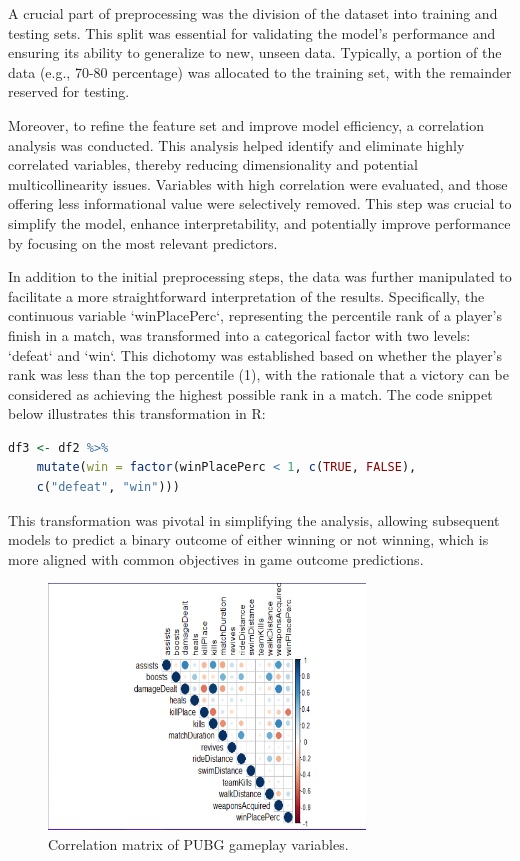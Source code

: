 \documentclass[12pt]{article}
\begin{document}
A crucial part of preprocessing was the division of the dataset into training and testing sets. This split was essential for validating the model's performance and ensuring its ability to generalize to new, unseen data. Typically, a portion of the data (e.g., 70-80 percentage) was allocated to the training set, with the remainder reserved for testing.

Moreover, to refine the feature set and improve model efficiency, a correlation analysis was conducted. This analysis helped identify and eliminate highly correlated variables, thereby reducing dimensionality and potential multicollinearity issues. Variables with high correlation were evaluated, and those offering less informational value were selectively removed. This step was crucial to simplify the model, enhance interpretability, and potentially improve performance by focusing on the most relevant predictors.

In addition to the initial preprocessing steps, the data was further manipulated to facilitate a more straightforward interpretation of the results. Specifically, the continuous variable `winPlacePerc`, representing the percentile rank of a player's finish in a match, was transformed into a categorical factor with two levels: `defeat` and `win`. This dichotomy was established based on whether the player's rank was less than the top percentile (1), with the rationale that a victory can be considered as achieving the highest possible rank in a match. The code snippet below illustrates this transformation in R:

\begin{lstlisting}[language=R, caption=Creating a binary outcome variable]
	df3 <- df2 %>%
	mutate(win = factor(winPlacePerc < 1, c(TRUE, FALSE), 
	c("defeat", "win")))
\end{lstlisting}

This transformation was pivotal in simplifying the analysis, allowing subsequent models to predict a binary outcome of either winning or not winning, which is more aligned with common objectives in game outcome predictions.


\begin{figure}[h]
	\centering
	\includegraphics[width=0.75\textwidth]{Correlation.png} %
	\caption{Correlation matrix of PUBG gameplay variables.}
	\label{fig:correlation_matrix}
\end{figure}
\end{document}
